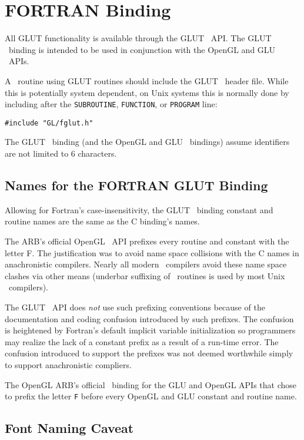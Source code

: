 \section{FORTRAN Binding}

All GLUT functionality is available through the GLUT \Fortran\ API.
The GLUT \Fortran\ binding is intended to be used in conjunction with the OpenGL and GLU
\Fortran\ APIs.

A \Fortran\ routine using GLUT routines should include the GLUT \Fortran\
header file.  While this is potentially system dependent, on Unix
systems this is normally done by including after the {\tt SUBROUTINE},
{\tt FUNCTION}, or {\tt PROGRAM} line:
\begin{verbatim}
#include "GL/fglut.h"
\end{verbatim}

The GLUT \Fortran\ binding (and the OpenGL and GLU \Fortran\ bindings)
assume identifiers are not limited to 6 characters.

\subsection{Names for the FORTRAN GLUT Binding}

Allowing for {\sc Fortran}'s case-insensitivity, the GLUT \Fortran\ binding
constant and routine names are the same as the C binding's names.

The ARB's official OpenGL \Fortran\ API prefixes every routine and
constant with the letter F.  The justification was to avoid name
space collisions with the C names in anachronistic compilers.  Nearly
all modern \Fortran\ compilers avoid these name space clashes via other
means (underbar suffixing of \Fortran\ routines is used by most Unix \Fortran\
compilers).

The GLUT \Fortran\ API does {\em not} use such prefixing conventions
because of the documentation and coding confusion introduced by
such prefixes.  The confusion is heightened by
{\sc Fortran}'s default implicit variable initialization so programmers
may realize the lack of a constant prefix as a result of a run-time error.
The confusion introduced to support the prefixes
was not deemed worthwhile simply to support anachronistic
compliers.

The OpenGL ARB's official \Fortran\ binding for the GLU and OpenGL APIs
that chose to prefix the letter {\tt F} before every OpenGL and GLU
constant and routine name.  

\subsection{Font Naming Caveat}

